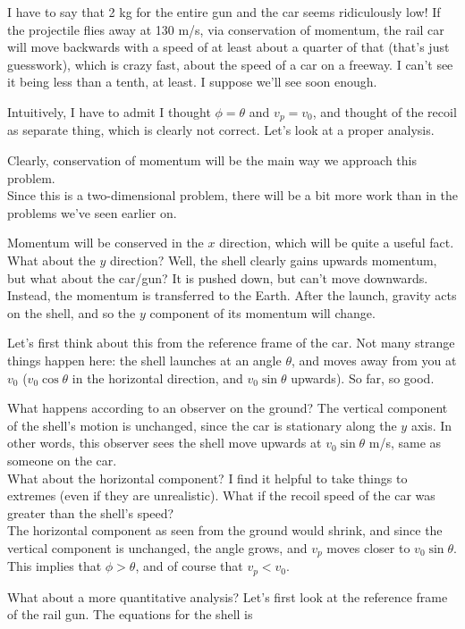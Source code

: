 \documentclass[8.01x]{subfiles}
\begin{document}
I have to say that 2 kg for the entire gun and the car seems ridiculously low! If the projectile flies away at 130 m/s, via conservation of momentum, the rail car will move backwards with a speed of at least about a quarter of that (that's just guesswork), which is crazy fast, about the speed of a car on a freeway. I can't see it being less than a tenth, at least. I suppose we'll see soon enough.

Intuitively, I have to admit I thought $\phi = \theta$ and $v_p = v_0$, and thought of the recoil as separate thing, which is clearly not correct. Let's look at a proper analysis.

Clearly, conservation of momentum will be the main way we approach this problem.\\
Since this is a two-dimensional problem, there will be a bit more work than in the problems we've seen earlier on.

Momentum will be conserved in the $x$ direction, which will be quite a useful fact. What about the $y$ direction? Well, the shell clearly gains upwards momentum, but what about the car/gun? It is pushed down, but can't move downwards. Instead, the momentum is transferred to the Earth. After the launch, gravity acts on the shell, and so the $y$ component of its momentum will change.

Let's first think about this from the reference frame of the car. Not many strange things happen here: the shell launches at an angle $\theta$, and moves away from you at $v_0$ ($v_0 \cos \theta$ in the horizontal direction, and $v_0 \sin \theta$ upwards). So far, so good.

What happens according to an observer on the ground? The vertical component of the shell's motion is unchanged, since the car is stationary along the $y$ axis. In other words, this observer sees the shell move upwards at $v_0 \sin \theta$ m/s, same as someone on the car.\\
What about the horizontal component? I find it helpful to take things to extremes (even if they are unrealistic). What if the recoil speed of the car was greater than the shell's speed?\\
The horizontal component as seen from the ground would shrink, and since the vertical component is unchanged, the angle grows, and $v_p$ moves closer to $v_0 \sin \theta$.\\
This implies that $\phi > \theta$, and of course that $v_p < v_0$.

What about a more quantitative analysis? Let's first look at the reference frame of the rail gun. The equations for the shell is
\end{document}
